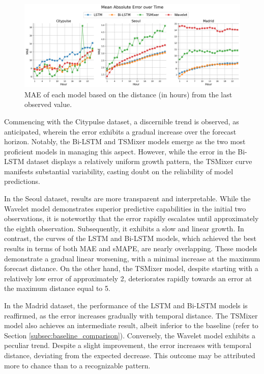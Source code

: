 \begin{figure}
    \centering
    \includegraphics[width=1\linewidth]{images/mae_per_hour.png}
    \caption{MAE of each model based on the distance (in hours) from the last observed value.}
    \label{fig:mae-per-hour}
\end{figure}

Commencing with the Citypulse dataset, a discernible trend is observed, as anticipated, wherein the error exhibits a gradual increase over the forecast horizon. Notably, the Bi-LSTM and TSMixer models emerge as the two most proficient models in managing this aspect. However, while the error in the Bi-LSTM dataset displays a relatively uniform growth pattern, the TSMixer curve manifests substantial variability, casting doubt on the reliability of model predictions.

In the Seoul dataset, results are more transparent and interpretable. While the Wavelet model demonstrates superior predictive capabilities in the initial two observations, it is noteworthy that the error rapidly escalates until approximately the eighth observation. Subsequently, it exhibits a slow and linear growth. In contrast, the curves of the LSTM and Bi-LSTM models, which achieved the best results in terms of both MAE and sMAPE, are nearly overlapping. These models demonstrate a gradual linear worsening, with a minimal increase at the maximum forecast distance. On the other hand, the TSMixer model, despite starting with a relatively low error of approximately 2, deteriorates rapidly towards an error at the maximum distance equal to 5.

In the Madrid dataset, the performance of the LSTM and Bi-LSTM models is reaffirmed, as the error increases gradually with temporal distance. The TSMixer model also achieves an intermediate result, albeit inferior to the baseline (refer to Section \ref{subsec:baseline_comparison}). Conversely, the Wavelet model exhibits a peculiar trend. Despite a slight improvement, the error increases with temporal distance, deviating from the expected decrease. This outcome may be attributed more to chance than to a recognizable pattern.\\

